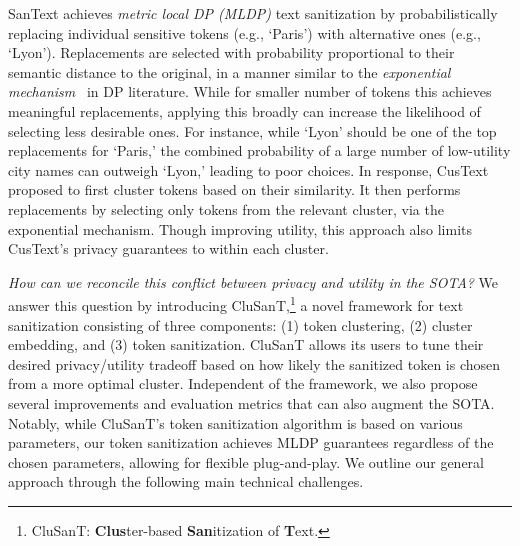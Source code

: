 \documentclass[11pt]{article}
\newcommand{\clusant}{CluSanT\xspace}
\begin{document}
SanText achieves {\em metric local DP (MLDP)} text sanitization by probabilistically replacing individual sensitive tokens (e.g., `Paris') with alternative ones (e.g., `Lyon'). Replacements are selected with probability proportional to their semantic distance to the original, in a manner similar to the {\em exponential mechanism}~\cite{mcsherry2007mechanism} in DP literature. 
While for smaller number of tokens this achieves meaningful replacements, applying this broadly can 
increase the likelihood of selecting less desirable ones. 
%
For instance, while `Lyon' should be one of the top replacements for `Paris,' the combined probability of a large number of low-utility city names can outweigh `Lyon,' leading to poor choices.
%
%
In response, CusText proposed to first cluster tokens based on their similarity. It then performs replacements by selecting only tokens from the relevant cluster, via the exponential mechanism.  
%
Though improving utility, this approach also limits CusText's privacy guarantees to within each cluster.


{\em How can we reconcile this conflict between privacy and utility in the SOTA?} We answer this question by introducing \clusant,\footnote{\clusant: \textbf{Clus}ter-based \textbf{San}itization of \textbf{T}ext.} a novel framework for text sanitization consisting of three components: (1) token clustering, (2) cluster embedding, and (3) token sanitization. \clusant  allows its users to tune their desired privacy/utility tradeoff based on how likely the sanitized token is chosen from a more optimal cluster. Independent of the framework, we also propose several improvements and evaluation metrics that can also augment the SOTA. 
Notably, while \clusant's token sanitization algorithm is based on various parameters, %
our token sanitization achieves MLDP guarantees regardless of the chosen parameters, allowing for flexible plug-and-play. 
We outline our general approach through the following main technical challenges.
\end{document}
